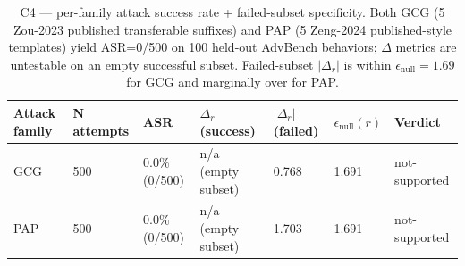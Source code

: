 \begin{table}[t]
\centering
\caption{C4 — per-family attack success rate + failed-subset specificity. Both GCG (5 Zou-2023 published transferable suffixes) and PAP (5 Zeng-2024 published-style templates) yield ASR=0/500 on 100 held-out AdvBench behaviors; $\Delta$ metrics are untestable on an empty successful subset. Failed-subset $|\Delta_r|$ is within $\epsilon_{\mathrm{null}}=1.69$ for GCG and marginally over for PAP.}
\label{tab:c4_attack_signature}
\begin{tabular}{lllllll}
\toprule
Attack family & N attempts & ASR & $\Delta_r$ (success) & $|\Delta_r|$ (failed) & $\epsilon_{\mathrm{null}}(r)$ & Verdict \\
\midrule
GCG & 500 & 0.0\% (0/500) & n/a (empty subset) & 0.768 & 1.691 & not-supported \\
PAP & 500 & 0.0\% (0/500) & n/a (empty subset) & 1.703 & 1.691 & not-supported \\
\bottomrule
\end{tabular}
\end{table}
